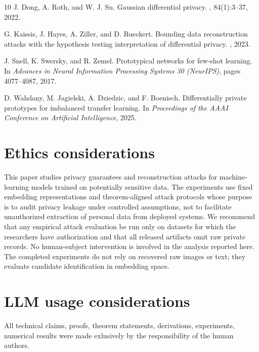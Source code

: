 \documentclass[conference,compsoc]{IEEEtran}
\begin{document}
\begin{thebibliography}{10}
J. Dong, A. Roth, and W. J. Su.
\newblock Gaussian differential privacy.
, 84(1):3--37, 2022.

G. Kaissis, J. Hayes, A. Ziller, and D. Rueckert.
\newblock Bounding data reconstruction attacks with the hypothesis testing interpretation of differential privacy.
, 2023.

J. Snell, K. Swersky, and R. Zemel.
\newblock Prototypical networks for few-shot learning.
\newblock In {\em Advances in Neural Information Processing Systems 30 (NeurIPS)}, pages 4077--4087, 2017.

D. Wahdany, M. Jagielski, A. Dziedzic, and F. Boenisch.
\newblock Differentially private prototypes for imbalanced transfer learning.
\newblock In {\em Proceedings of the AAAI Conference on Artificial Intelligence}, 2025.

\end{thebibliography}

\section*{Ethics considerations}
This paper studies privacy guarantees and reconstruction attacks for machine-learning models trained on potentially sensitive data. The experiments use fixed embedding representations and theorem-aligned attack protocols whose purpose is to audit privacy leakage under controlled assumptions, not to facilitate unauthorized extraction of personal data from deployed systems. We recommend that any empirical attack evaluation be run only on datasets for which the researchers have authorization and that all released artifacts omit raw private records. No human-subject intervention is involved in the analysis reported here. The completed experiments do not rely on recovered raw images or text; they evaluate candidate identification in embedding space. 

\section*{LLM usage considerations}
All technical claims, proofs, theorem statements, derivations, experiments, numerical results were made exlusively by the responsibility of the human authors.

\appendices
\end{document}
